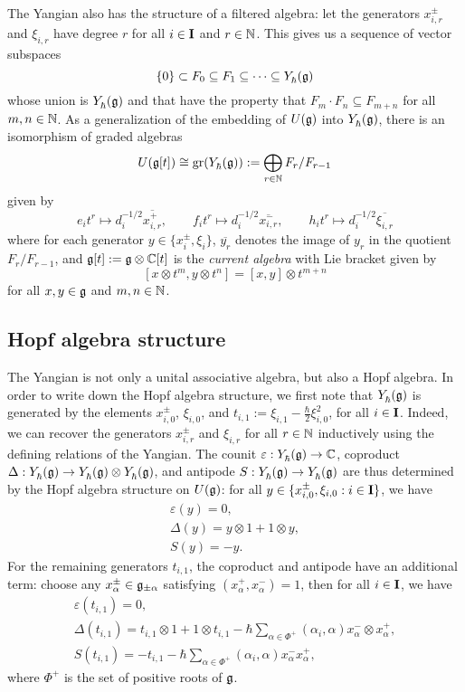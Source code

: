 The Yangian also has the structure of a filtered algebra: let the generators $x^\pm_{i,r}$ and $\xi_{i,r}$ have degree $r$ for all $i\in\mathbf{I}$ and $r\in\mathbb{N}$.
This gives us a sequence of vector subspaces
\[\{0\}\subset F_0\subseteq F_1\subseteq\cdots\subseteq Y_\hbar^{}(\mathfrak{g})\]
whose union is $Y_\hbar^{}(\mathfrak{g})$ and that have the property that $F_m\cdot F_n\subseteq F_{m+n}$ for all $m,n\in\mathbb{N}$.
As a generalization of the embedding of $U(\mathfrak{g})$ into $Y_\hbar^{}(\mathfrak{g})$, there is an isomorphism of graded algebras
\[U(\mathfrak{g}[t]) \cong \operatorname{gr}(Y_\hbar^{}(\mathfrak{g})) := \bigoplus_{r\in\mathbb{N}}F_r/F_{r-1}\]
given by
\[e_it^r\mapsto d_i^{-1/2}\overline{x^+_{i,r}}, \qquad f_it^r\mapsto d_i^{-1/2}\overline{x^-_{i,r}}, \qquad h_it^r\mapsto d_i^{-1/2}\overline{\xi_{i,r}}\]
where for each generator $y\in\{x^\pm_i,\xi_i\}$, $\overline{y_r}$ denotes the image of $y_r$ in the quotient $F_r/F_{r-1}$, and $\mathfrak{g}[t] := \mathfrak{g}\otimes\mathbb{C}[t]$ is the \emph{current algebra} with Lie bracket given by
\[[x\otimes t^m, y\otimes t^n] = [x,y]\otimes t^{m+n}\]
for all $x,y\in\mathfrak{g}$ and $m,n\in\mathbb{N}$.


\subsection{Hopf algebra structure}\label{ssec:Y-Hopf}

The Yangian is not only a unital associative algebra, but also a Hopf algebra.
In order to write down the Hopf algebra structure, we first note that $Y_\hbar^{}(\mathfrak{g})$ is generated by the elements $x^\pm_{i,0}$, $\xi_{i,0}$, and $t_{i,1} := \xi_{i,1}-\frac{\hbar}{2}\xi_{i,0}^2$, for all $i\in\mathbf{I}$.
Indeed, we can recover the generators $x^\pm_{i,r}$ and $\xi_{i,r}$ for all $r\in\mathbb{N}$ inductively using the defining relations of the Yangian.
The counit $\varepsilon:Y_\hbar^{}(\mathfrak{g})\to\mathbb{C}$, coproduct $\Delta:Y_\hbar^{}(\mathfrak{g})\to Y_\hbar^{}(\mathfrak{g})\otimes Y_\hbar^{}(\mathfrak{g})$, and antipode $S:Y_\hbar^{}(\mathfrak{g})\to Y_\hbar^{}(\mathfrak{g})$ are thus determined by the Hopf algebra structure on $U(\mathfrak{g})$: for all $y\in\{x^\pm_{i,0},\xi_{i,0} : i\in\mathbf{I}\}$, we have
\begin{gather*}
    \varepsilon(y) = 0, \\
    \Delta(y) = y\otimes 1 + 1\otimes y, \\
    S(y) = -y.
\end{gather*}
For the remaining generators $t_{i,1}$, the coproduct and antipode have an additional term: choose any $x^\pm_\alpha\in\mathfrak{g}_{\pm\alpha}$ satisfying $(x^+_\alpha,x^-_\alpha)=1$, then for all $i\in\mathbf{I}$, we have
\begin{gather*}
    \varepsilon(t_{i,1}) = 0, \\
    \Delta(t_{i,1}) = t_{i,1}\otimes 1 + 1\otimes t_{i,1} - \hbar\sum_{\alpha\in\Phi^+}(\alpha_i,\alpha) x^-_\alpha \otimes x^+_\alpha, \\
    S(t_{i,1}) = -t_{i,1} - \hbar\sum_{\alpha\in\Phi^+}(\alpha_i,\alpha) x^-_\alpha x^+_\alpha,
\end{gather*}
where $\Phi^+$ is the set of positive roots of $\mathfrak{g}$.

